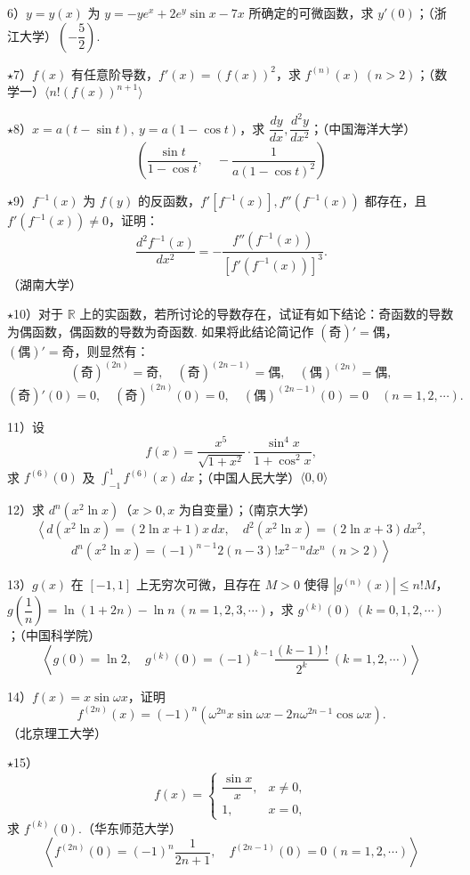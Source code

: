 \documentclass[UTF8, 12pt, fontset=fandol, oneside]{ctexart}
\begin{document}
6）$y=y(x)$ 为 $y=-ye^x+2e^y\sin x-7x$ 所确定的可微函数，求 $y'(0)$；（浙江大学）\quad $\left(-\dfrac52\right)$.

$\star$7）$f(x)$ 有任意阶导数，$f'(x)=(f(x))^2$，求 $f^{(n)}(x)\ (n>2)$；（数学一）\quad $\langle n!(f(x))^{n+1}\rangle$

$\star$8）$x=a(t-\sin t),\ y=a(1-\cos t)$，求 $\dfrac{dy}{dx},\dfrac{d^2y}{dx^2}$；（中国海洋大学）
\[
  \left(\frac{\sin t}{1-\cos t},\quad -\frac1{a(1-\cos t)^2}\right)
\]

$\star$9）$f^{-1}(x)$ 为 $f(y)$ 的反函数，$f'[f^{-1}(x)],f''(f^{-1}(x))$ 都存在，且 $f'(f^{-1}(x))\ne0$，证明：
\[
  \frac{d^2f^{-1}(x)}{dx^2}
  =-\frac{f''(f^{-1}(x))}{[f'(f^{-1}(x))]^3}.
\]
（湖南大学）

$\star$10）对于 $\mathbb R$ 上的实函数，若所讨论的导数存在，试证有如下结论：奇函数的导数为偶函数，偶函数的导数为奇函数. 如果将此结论简记作 $(\text{奇})'=\text{偶}$，$(\text{偶})'=\text{奇}$，则显然有：
\[
  (\text{奇})^{(2n)}=\text{奇},\quad
  (\text{奇})^{(2n-1)}=\text{偶},\quad
  (\text{偶})^{(2n)}=\text{偶},
\]
\[
  (\text{奇})'(0)=0,\quad
  (\text{奇})^{(2n)}(0)=0,\quad
  (\text{偶})^{(2n-1)}(0)=0\quad(n=1,2,\cdots).
\]

11）设
\[
  f(x)=\frac{x^5}{\sqrt{1+x^2}}\cdot\frac{\sin^4x}{1+\cos^2x},
\]
求 $f^{(6)}(0)$ 及 $\int_{-1}^1 f^{(6)}(x)\,dx$；（中国人民大学）\quad $\langle0,0\rangle$

12）求 $d^n(x^2\ln x)$（$x>0,x$ 为自变量）；（南京大学）
\[
  \left\langle d(x^2\ln x)=(2\ln x+1)x\,dx,\quad
  d^2(x^2\ln x)=(2\ln x+3)dx^2,\right.
\]
\[
  \left. d^n(x^2\ln x)=(-1)^{n-1}2(n-3)!x^{2-n}dx^n\ (n>2)\right\rangle
\]

13）$g(x)$ 在 $[-1,1]$ 上无穷次可微，且存在 $M>0$ 使得 $|g^{(n)}(x)|\le n!M$，$g\left(\dfrac1n\right)=\ln(1+2n)-\ln n\ (n=1,2,3,\cdots)$，求 $g^{(k)}(0)\ (k=0,1,2,\cdots)$；（中国科学院）
\[
  \left\langle g(0)=\ln2,\quad
  g^{(k)}(0)=(-1)^{k-1}\frac{(k-1)!}{2^k}\ (k=1,2,\cdots)\right\rangle
\]

14）$f(x)=x\sin\omega x$，证明
\[
  f^{(2n)}(x)=(-1)^n(\omega^{2n}x\sin\omega x-2n\omega^{2n-1}\cos\omega x).
\]
（北京理工大学）

$\star$15）
\[
f(x)=
\begin{cases}
\dfrac{\sin x}x, & x\ne0,\\
1, & x=0,
\end{cases}
\]
求 $f^{(k)}(0)$.（华东师范大学）
\[
  \left\langle f^{(2n)}(0)=(-1)^n\frac1{2n+1},\quad
  f^{(2n-1)}(0)=0\ (n=1,2,\cdots)\right\rangle
\]
\end{document}
